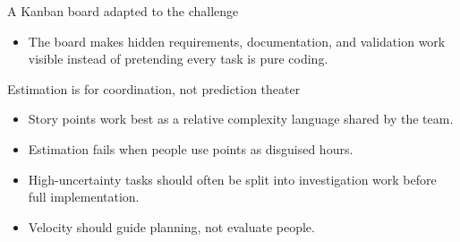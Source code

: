 \begin{frame}{A Kanban board adapted to the challenge}
\centering
{}
\vspace{0.5em}\begin{itemize}\item The board makes hidden requirements, documentation, and validation work visible instead of pretending every task is pure coding.\end{itemize}
\coursefooter
\end{frame}

\begin{frame}{Estimation is for coordination, not prediction theater}
\begin{itemize}
\item Story points work best as a relative complexity language shared by the team.
\item Estimation fails when people use points as disguised hours.
\item High-uncertainty tasks should often be split into investigation work before full implementation.
\item Velocity should guide planning, not evaluate people.
\end{itemize}
\coursefooter
\end{frame}

